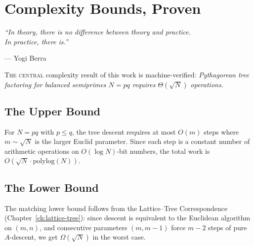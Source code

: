 \documentclass[11pt,twoside,openright]{book}
\theoremstyle{definition}
\begin{document}
\chapter{Complexity Bounds, Proven}
\label{ch:complexity}

\epigraph{\itshape ``In theory, there is no difference between theory and practice.\\
In practice, there is.''}
{--- Yogi Berra}

\lettrine[lines=3]{T}{he central} complexity result of this work is
machine-verified: \emph{Pythagorean tree factoring for balanced semiprimes
$N = pq$ requires $\Theta(\sqrt{N})$ operations.}

\section{The Upper Bound}

For $N = pq$ with $p \leq q$, the tree descent requires at most
$O(m)$ steps where $m \sim \sqrt{N}$ is the larger Euclid parameter.
Since each step is a constant number of arithmetic operations on
$O(\log N)$-bit numbers, the total work is $O(\sqrt{N} \cdot \mathrm{polylog}(N))$.

\section{The Lower Bound}

The matching lower bound follows from the Lattice--Tree Correspondence
(Chapter~\ref{ch:lattice-tree}): since descent is equivalent to the
Euclidean algorithm on $(m,n)$, and consecutive parameters $(m, m-1)$
force $m - 2$ steps of pure $A$-descent, we get $\Omega(\sqrt{N})$
in the worst case.

\begin{center}
\end{center}
\end{document}

